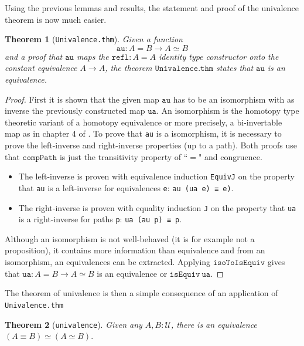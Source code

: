 \documentclass[12pt,a4paper,twoside,xetex]{book} %
\newtheorem{theorem}{Theorem}[section]
\newcommand{\op}[1]{\mathtt{#1}}
\begin{document}
Using the previous lemmas and results, the statement and proof of the 
univalence theorem is now much easier.

\begin{theorem}[\texttt{Univalence.thm}]
Given a function  $$\op{au} : A = B \rightarrow A \simeq B$$ and a proof that 
$\op{au}$ maps the $\op{refl} : A = A$ identity type constructor onto the 
constant equivalence $A \rightarrow A$, the theorem $\op{Univalence.thm}$ 
states that $\op{au}$ is an equivalence.
\end{theorem}

\begin{proof}
First it is shown that the given map $\op{au}$ has to be an isomorphism with as 
inverse the previously constructed map $\op{ua}$. An isomorphism is the 
homotopy type theoretic variant of a homotopy equivalence or more precisely, a 
bi-invertable map as in chapter 4 of \cite{Voevodsky2013}. To prove that 
\texttt{au} is a isomorphism, it is necessary to prove the left-inverse and 
right-inverse properties (up to a path). Both proofs use that $\op{compPath}$ 
is just the transitivity property of ``$=$" and congruence. 
\begin{itemize}
\item The left-inverse is proven with equivalence induction \texttt{EquivJ} on 
the property that \texttt{au} is a left-inverse for equivalences \texttt{e}: 
\texttt{au (ua e) ≡ e)}. 
\item The right-inverse is proven with equality induction \texttt{J} on the 
property that \texttt{ua} is a right-inverse for paths \texttt{p}: \texttt{ua 
(au p) ≡ p}. 
\end{itemize}
Although an isomorphism is not well-behaved (it is for example not a 
proposition), it contains more information than equivalence and from an 
isomorphism, an equivalences can be extracted. Applying $\op{isoToIsEquiv}$ 
gives that $\op{ua} : A = B \rightarrow A \simeq B$ is an equivalence or 
$\op{isEquiv}\ \op{ua}$. 
\end{proof}

The theorem of univalence is then a simple consequence of an application of 
\texttt{Univalence.thm}

\begin{theorem}[\texttt{univalence}]
Given any $A,B : \mathcal{U}$, there is an equivalence $\left( A \equiv B 
\right) \simeq \left( A \simeq B \right).$
\end{theorem}
\end{document}

